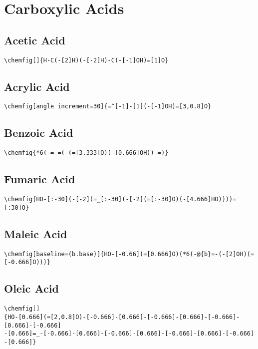 \chapter{Carboxylic Acids}\label{app:carboxylic-acids}


\section{Acetic Acid}\label{app:acetic-acid}
\begin{lstlisting}
\chemfig[]{H-C(-[2]H)(-[-2]H)-C(-[-1]OH)=[1]O}
\end{lstlisting}


\section{Acrylic Acid}\label{app:acrylic-acid}
\begin{lstlisting}
\chemfig[angle increment=30]{=^[-1]-[1](-[-1]OH)=[3,0.8]O}
\end{lstlisting}


\section{Benzoic Acid}\label{app:benzoic-acid}
\begin{lstlisting}
\chemfig{*6(-=-=(-(=[3.333]O)(-[0.666]OH))-=)}
\end{lstlisting}


\section{Fumaric Acid}\label{app:fumaric-acid}
\begin{lstlisting}
\chemfig{HO-[:-30](-[-2](=_[:-30](-[-2](=[:-30]O)(-[4.666]HO))))=[:30]O}
\end{lstlisting}


\section{Maleic Acid}\label{app:maleic-acid}
\begin{lstlisting}
\chemfig[baseline=(b.base)]{HO-[-0.66](=[0.666]O)(*6(-@{b}=-(-[2]OH)(=[-0.666]O)))}
\end{lstlisting}


\section{Oleic Acid}\label{app:oleic-acid}
\begin{lstlisting}
\chemfig[]
{HO-[0.666](=[2,0.8]O)-[-0.666]-[0.666]-[-0.666]-[0.666]-[-0.666]-[0.666]-[-0.666]
-[0.666]=_-[-0.666]-[0.666]-[-0.666]-[0.666]-[-0.666]-[0.666]-[-0.666]
-[0.666]}
\end{lstlisting}



